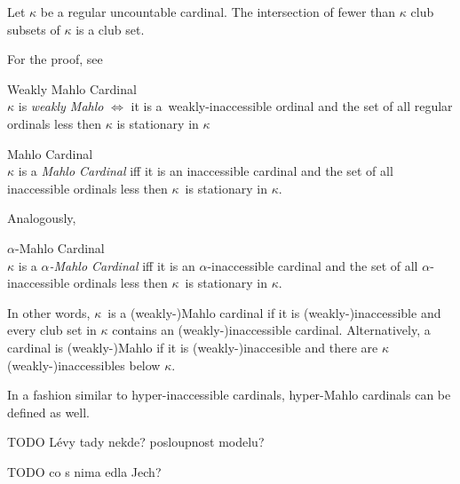 \begin{theorem}\label{club_intersection} 
Let $\kappa$ be a regular uncountable cardinal. The intersection of fewer than $\kappa$ club subsets of $\kappa$ is a club set.
\end{theorem}
For the proof, see \cite[Theorem 8.3]{JechBook}

\begin{definition}{Weakly Mahlo Cardinal}\label{def:weakly_mahlo}\\
$\kappa$ is \emph{weakly Mahlo} $\iff$ it is a~weakly-inaccessible ordinal and the set of all regular ordinals less then $\kappa$ is stationary in $\kappa$
\end{definition}

\begin{definition}{Mahlo Cardinal}\label{def:mahlo_cardinal}\\
$\kappa$ is a \emph{Mahlo Cardinal} iff it is an inaccessible cardinal and the set of all inaccessible ordinals less then $\kappa$ is stationary in $\kappa$.
\end{definition}

Analogously, 
\begin{definition}{$\alpha$-Mahlo Cardinal}\label{def:alpha_mahlo_cardinal}\\
$\kappa$ is a \emph{$\alpha$-Mahlo Cardinal} iff it is an $\alpha$-inaccessible cardinal and the set of all $\alpha$-inaccessible ordinals less then $\kappa$ is stationary in $\kappa$.
\end{definition}

In other words, $\kappa$ is a (weakly-)Mahlo cardinal if it is (weakly-)inaccessible and every club set in $\kappa$ contains an (weakly-)inaccessible cardinal. Alternatively, a cardinal is (weakly-)Mahlo if it is (weakly-)inaccesible and there are $\kappa$ (weakly-)inaccessibles below $\kappa$.


In a fashion similar to hyper-inaccessible cardinals, hyper-Mahlo cardinals can be defined as well.

TODO Lévy tady nekde? posloupnost modelu?

TODO co s nima edla Jech?

